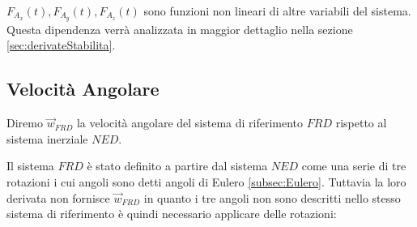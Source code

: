\begin{note}
    $F_{A_x}(t), F_{A_y}(t), F_{A_z}(t)$ sono funzioni non lineari di altre variabili del sistema. Questa dipendenza verrà analizzata in maggior dettaglio nella sezione \ref{sec:derivateStabilita}.
\end{note}
\subsection{Velocità Angolare}

Diremo $\vec{w}_{FRD}$ la velocità angolare del sistema di riferimento $FRD$ rispetto al sistema inerziale $NED$.

Il sistema $FRD$ è stato definito a partire dal sistema $NED$ come una serie di tre rotazioni i cui angoli sono detti angoli di Eulero \ref{subsec:Eulero}.
Tuttavia la loro derivata non fornisce $\vec{w}_{FRD}$ in quanto i tre angoli non sono descritti nello stesso sistema di riferimento è quindi necessario applicare delle rotazioni:

